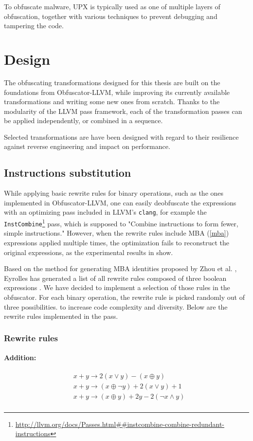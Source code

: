 \documentclass[
  digital, %
  notable,   %
  twoside, %
  nolof,     %
  nolot,     %
]{fithesis3}
\theoremstyle{definition}
\begin{document}
To obfuscate malware, UPX is typically used as one of multiple layers of obfuscation, together with various techniques to prevent debugging and tampering the code. 

\chapter{Design} \label{chap:design}

The obfuscating transformations designed for this thesis are built on the foundations from Obfuscator-LLVM, while improving its currently available transformations and writing some new ones from scratch. Thanks to the modularity of the LLVM pass framework, each of the transformation passes can be applied independently, or combined in a sequence.

Selected transformations are have been designed with regard to their resilience against reverse engineering and impact on performance.

\section{Instructions substitution}
While applying basic rewrite rules for binary operations, such as the ones implemented in Obfuscator-LLVM, one can easily deobfuscate the expressions with an optimizing pass included in LLVM's \texttt{clang}, for example the \texttt{InstCombine}\footnote{\url{http://llvm.org/docs/Passes.html##instcombine-combine-redundant-instructions}} pass, which is supposed to "Combine instructions to form fewer, simple instructions." However, when the rewrite rules include MBA (\ref{mba}) expressions applied multiple times, the optimization fails to reconstruct the original expressions, as the experimental results in \cite{eyrollesMBAobf} show. 

Based on the method for generating MBA identities proposed by Zhou et al. \cite{mba_zhou}, Eyrolles has generated a list of all rewrite rules composed of three boolean expressions \cite{eyrollesMBAobf}. We have decided to implement a selection of those rules in the obfuscator. For each binary operation, the rewrite rule is picked randomly out of three possibilities. to increase code complexity and diversity. Below are the rewrite rules implemented in the pass.

\subsection{Rewrite rules}
\subsubsection{Addition:}
$$
\begin{aligned}
&x+y \rightarrow 2(x \vee y) - (x \oplus y) \\
&x+y \rightarrow(x \oplus \neg y)+ 2( x \vee y) + 1 \\
&x+y \rightarrow(x \oplus y)+2 y-2 (\neg x \wedge y) \\
\end{aligned}
$$
\end{document}
